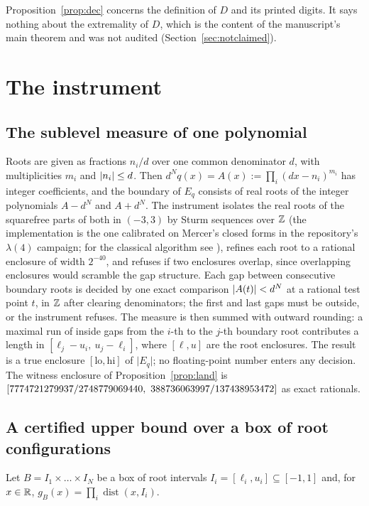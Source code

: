 \documentclass[11pt]{article}
\newcommand{\dist}{\operatorname{dist}}
\newcommand{\meas}[1]{\lvert #1 \rvert}
\begin{document}
Proposition~\ref{prop:dec} concerns the definition of $D$ and its printed digits. It says
nothing about the extremality of $D$, which is the content of the manuscript's main theorem and
was not audited (Section~\ref{sec:notclaimed}).

\section{The instrument}\label{sec:inst}

\subsection{The sublevel measure of one polynomial}\label{sec:one}

Roots are given as fractions $n_i/d$ over one common denominator $d$, with multiplicities $m_i$
and $\lvert n_i \rvert\le d$. Then $d^Nq(x)=A(x):=\prod_i(dx-n_i)^{m_i}$ has integer coefficients, and
the boundary of $E_q$ consists of real roots of the integer polynomials $A-d^N$ and $A+d^N$.
The instrument isolates the real roots of the squarefree parts of both in $(-3,3)$ by Sturm
sequences over $\mathbb{Z}$ (the implementation is the one calibrated on Mercer's closed forms in the
repository's $\lambda(4)$ campaign; for the classical algorithm see \cite{BPR06}), refines each
root to a rational enclosure of width $2^{-40}$, and refuses if two enclosures overlap, since
overlapping enclosures would scramble the gap structure. Each gap between consecutive boundary
roots is decided by one exact comparison $\lvert A(t) \rvert<d^N$ at a rational test point $t$, in
$\mathbb{Z}$ after clearing denominators; the first and last gaps must be outside, or the instrument
refuses. The measure is then summed with outward rounding: a maximal run of inside gaps from the
$i$-th to the $j$-th boundary root contributes a length in
$[\ell_j-u_i,\ u_j-\ell_i]$, where $[\ell,u]$ are the root enclosures. The result is a true
enclosure $[\mathrm{lo},\mathrm{hi}]$ of $\meas{E_q}$; no floating-point number enters any
decision. The witness enclosure of Proposition~\ref{prop:land} is
$[7774721279937/2748779069440,\ 388736063997/137438953472]$ as exact rationals.

\subsection{A certified upper bound over a box of root configurations}\label{sec:box}

Let $B=I_1\times\dots\times I_N$ be a box of root intervals $I_i=[\ell_i,u_i]\subseteq[-1,1]$
and, for $x\in\mathbb{R}$, $g_B(x)=\prod_i\dist(x,I_i)$.
\end{document}
